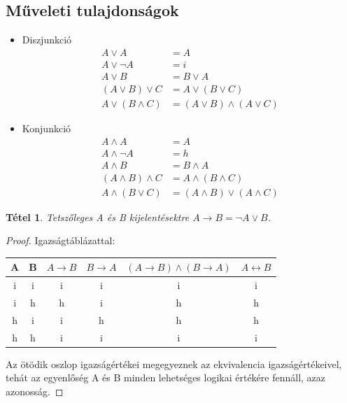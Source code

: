 \documentclass[twoside,12pt]{report}
\newtheorem{theorem}{Tétel}[section]
\theoremstyle{definition}
\begin{document}
	\subsection{Műveleti tulajdonságok}
	\begin{itemize}
		\item Diszjunkció
			\begin{align*}
				A\vee A&=A\\
				A\vee \neg A&=i\\
				A\vee B&=B\vee A\tag{Kommutatív}\\
				(A\vee B)\vee C&=A\vee(B\vee C)\tag{Asszociatív}\\
				A\vee(B\wedge C)&=(A\vee B)\wedge(A\vee C)\tag{Konjunkcióra nézve disztributív}
			\end{align*}
		\item Konjunkció
			\begin{align*}
				A\wedge A&=A\\
				A\wedge \neg A&=h\\
				A\wedge B&=B\wedge A\tag{Kommutatív}\\
				(A\wedge B)\wedge C&=A\wedge(B\wedge C)\tag{Asszociatív}\\
				A\wedge(B\vee C)&=(A\wedge B)\vee(A\wedge C)\tag{Diszjunkcióra nézve disztributív}
			\end{align*}
	\end{itemize}
	\begin{theorem}
		Tetszőleges A és B kijelentésektre $A\rightarrow B=\neg A\vee B$.
	\end{theorem}
	\begin{proof}
		Igazságtáblázattal:
		\begin{table}[H]
			\begin{tabular}{|c|c|c|c|c|c|}
				\hline
				A&B&$A\rightarrow B$&$B\rightarrow A$&$(A\rightarrow B)\wedge(B\rightarrow A)$&$A\leftrightarrow B$\\\hline
				i&i&i&i&i&i\\\hline
				i&h&h&i&h&h\\\hline
				h&i&i&h&h&h\\\hline
				h&h&i&i&i&i\\\hline
			\end{tabular}
		\end{table}
		Az ötödik oszlop igazságértékei megegyeznek az ekvivalencia igazságértékeivel, tehát az
		egyenlőség A és B minden lehetséges logikai értékére fennáll, azaz azonosság.
	\end{proof}
\pagebreak
\end{document}
